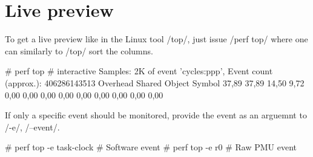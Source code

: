 \section{Live preview}

To get a live preview like in the Linux tool /top/, just issue /perf
top/ where one can similarly to /top/ sort the columns.

\starttyping
# perf top # interactive
Samples: 2K of event 'cycles:ppp', Event count (approx.): 406286143513
Overhead  Shared Object                     Symbol
  37,89%
  37,89%
  14,50%
   9,72%
   0,00%
   0,00%
   0,00%
   0,00%
   0,00%
   0,00%
   0,00%
   0,00%
   0,00%
\stoptyping

If only a specific event should be monitored, provide the event as an
arguemnt to /-e/, /--event/.

\starttyping
# perf top -e task-clock # Software event
# perf top -e r0         # Raw PMU event
\stoptyping
